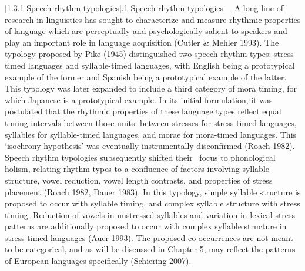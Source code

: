 \documentclass[12pt]{article}
\makeatletter
\renewcommand\section{\@startsection{section}{1}{0.0in}{0in}{0.1mm}{\normalfont\normalsize\fontsize{18pt}{21.6pt}\selectfont\rmfamily\bfseries\upshape\raggedright}}
\newenvironment{styleBody}{\renewcommand\baselinestretch{1.0}\setlength\leftskip{0in}\setlength\rightskip{0in plus 1fil}\setlength\parindent{0in}\setlength\parfillskip{0pt plus 1fil}\setlength\parskip{0in plus 1pt}\writerlistparindent\writerlistleftskip\leavevmode\normalfont\normalsize\fontsize{11pt}{13.2pt}\selectfont\mdseries\upshape\writerlistlabel\ignorespaces}{\unskip\vspace{0in plus 1pt}\par}
\newcommand\writerlistleftskip{}
\newcommand\writerlistparindent{}
\newcommand\writerlistlabel{}
\makeatother
\begin{document}
\section[1.3.1 Speech rhythm typologies]{.1 Speech rhythm typologies}
\begin{styleBody}
\ \ A long line of research in linguistics has sought to characterize and measure rhythmic properties of language which are perceptually and psychologically salient to speakers and play an important role in language acquisition (Cutler \& Mehler 1993). The typology proposed by Pike (1945) distinguished two speech rhythm types: stress-timed languages and syllable-timed languages, with English being a prototypical example of the former and Spanish being a prototypical example of the latter. This typology was later expanded to include a third category of mora timing, for which Japanese is a prototypical example. In its initial formulation, it was postulated that the rhythmic properties of these language types reflect equal timing intervals between those units: between stresses for stress-timed languages, syllables for syllable-timed languages, and morae for mora-timed languages. This ‘isochrony hypothesis’ was eventually instrumentally disconfirmed (Roach 1982). Speech rhythm typologies subsequently shifted their \ focus to phonological holism, relating rhythm types to a confluence of factors involving syllable structure, vowel reduction, vowel length contrasts, and properties of stress placement (Roach 1982, Dauer 1983). In this typology, simple syllable structure is proposed to occur with syllable timing, and complex syllable structure with stress timing. Reduction of vowels in unstressed syllables and variation in lexical stress patterns are additionally proposed to occur with complex syllable structure in stress-timed languages (Auer 1993). The proposed co-occurrences are not meant to be categorical, and as will be discussed in Chapter 5, may reflect the patterns of European languages specifically (Schiering 2007).
\end{styleBody}
\end{document}
